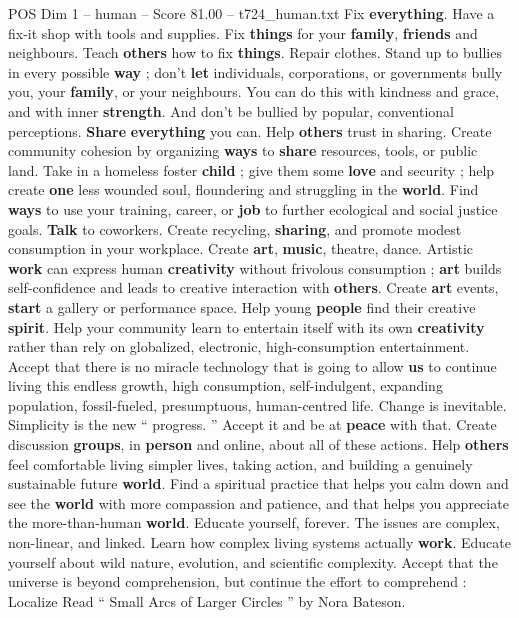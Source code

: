 \begin{textsample}{POS Dim 1 – human – Score 81.00 – t724\_human.txt}
Fix \textbf{everything}.
Have a fix-it shop with tools and supplies.
Fix \textbf{things} for your \textbf{family}, \textbf{friends} and neighbours.
Teach \textbf{others} how to fix \textbf{things}.
Repair clothes.
Stand up to bullies in every possible \textbf{way} ; don't \textbf{let} individuals, corporations, or governments bully you, your \textbf{family}, or your neighbours.
You can do this with kindness and grace, and with inner \textbf{strength}.
And don't be bullied by popular, conventional perceptions. \textbf{Share} \textbf{everything} you can.
Help \textbf{others} trust in sharing.
Create community cohesion by organizing \textbf{ways} to \textbf{share} resources, tools, or public land.
Take in a homeless foster \textbf{child} ; give them some \textbf{love} and security ; help create \textbf{one} less wounded soul, floundering and struggling in the \textbf{world}.
Find \textbf{ways} to use your training, career, or \textbf{job} to further ecological and social justice goals. \textbf{Talk} to coworkers.
Create recycling, \textbf{sharing}, and promote modest consumption in your workplace.
Create \textbf{art}, \textbf{music}, theatre, dance.
Artistic \textbf{work} can express human \textbf{creativity} without frivolous consumption ; \textbf{art} builds self-confidence and leads to creative interaction with \textbf{others}.
Create \textbf{art} events, \textbf{start} a gallery or performance space.
Help young \textbf{people} find their creative \textbf{spirit}.
Help your community learn to entertain itself with its own \textbf{creativity} rather than rely on globalized, electronic, high-consumption entertainment.
Accept that there is no miracle technology that is going to allow \textbf{us} to continue living this endless growth, high consumption, self-indulgent, expanding population, fossil-fueled, presumptuous, human-centred life.
Change is inevitable.
Simplicity is the new “ progress. ” Accept it and be at \textbf{peace} with that.
Create discussion \textbf{groups}, in \textbf{person} and online, about all of these actions.
Help \textbf{others} feel comfortable living simpler lives, taking action, and building a genuinely sustainable future \textbf{world}.
Find a spiritual practice that helps you calm down and see the \textbf{world} with more compassion and patience, and that helps you appreciate the more-than-human \textbf{world}.
Educate yourself, forever.
The issues are complex, non-linear, and linked.
Learn how complex living systems actually \textbf{work}.
Educate yourself about wild nature, evolution, and scientific complexity.
Accept that the universe is beyond comprehension, but continue the effort to comprehend : Localize Read “ Small Arcs of Larger Circles ” by Nora Bateson.

\end{textsample}
